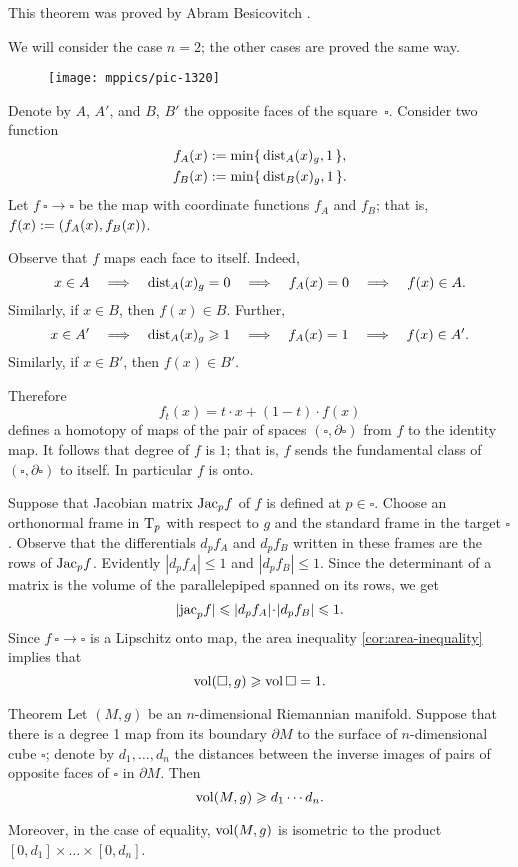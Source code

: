 This theorem was proved by Abram Besicovitch \cite{besicovitch}.

We will consider the case $n=2$; the other cases are proved the same way.

\begin{wrapfigure}{r}{30mm}
\vskip-0mm
\centering
\texttt{[image: mppics/pic-1320]}
\end{wrapfigure}

Denote by $A$, $A'$, and $B$, $B'$ the opposite faces of the square~$\square$.
Consider two function 
\begin{align*}
f_A(x)&\mathrel{:=}\min\{\,\mathrm{dist}_A(x)_g,1\,\},
\\
f_B(x)&\mathrel{:=}\min\{\,\mathrm{dist}_B(x)_g,1\,\}.
\end{align*}
Let $f\:\square\to\square$ be the map with coordinate functions $f_A$ and $f_B$;
that is, $f(x)\mathrel{:=}(f_A(x), f_B(x))$.

Observe that $f$ maps each face to itself.
Indeed, 
\[x\in A \quad\Longrightarrow\quad \mathrm{dist}_A(x)_g=0 \quad\Longrightarrow\quad f_A(x)=0 \quad\Longrightarrow\quad f(x)\in A.\]
Similarly, if $x\in B$, then $f(x)\in B$.
Further, 
\[x\in A'
\quad\Longrightarrow\quad 
\mathrm{dist}_A(x)_g\geqslant 1 
\quad\Longrightarrow\quad 
f_A(x)=1 
\quad\Longrightarrow\quad 
f(x)\in A'.\]
Similarly, if $x\in B'$, then $f(x)\in B'$.

Therefore 
\[f_t(x)= t\cdot x + (1-t)\cdot f(x)\]
defines a homotopy of maps of the pair of spaces $(\square,\partial \square)$ from $f$ to the identity map.
It follows that degree of $f$ is $1$; that is, $f$ sends the fundamental class of $(\square,\partial \square)$ to itself.
In particular $f$ is onto.

Suppose that Jacobian  matrix $\mathrm{Jac}_pf$ of $f$ is defined at $p\in \square$.
Choose an orthonormal frame in $\mathrm{T}_p$ with respect to $g$ and the standard frame in the target $\square$.
Observe that the differentials $d_pf_A$ and $d_pf_B$ written in these frames are the rows of $\mathrm{Jac}_pf$.
Evidently $|d_pf_A|\le 1$ and $|d_pf_B|\le 1$.
Since the determinant of a matrix is the volume of the parallelepiped spanned on its rows, we get 
\[|\jac_p f|\le |d_pf_A|\cdot|d_pf_B|\le 1.\]
Since $f\:\square\to\square$ is a Lipschitz onto map, the {}area inequality \ref{cor:area-inequality} implies that 
\[\operatorname{\rm vol}\nolimits(\square,g)\geqslant \operatorname{\rm vol}\nolimits\square=1.\]
\qedsf


\begin{thm}{Theorem}\label{thm:besikovitch+}
Let $(M,g)$ be an $n$-dimensional Riemannian manifold.
Suppose that there is a degree 1 map from its boundary $\partial M$ to the surface of $n$-dimensional cube $\square$;
denote by $d_1,\dots, d_n$ the distances between the inverse images of pairs of opposite faces of $\square$ in $\partial M$.
Then 
\[\operatorname{\rm vol}\nolimits(M,g)\geqslant d_1\cdots d_n.\]

Moreover, in the case of equality, $\operatorname{\rm vol}\nolimits(M,g)$ is isometric to the product $[0,d_1]\times\dots\times[0,d_n]$.
\end{thm}

